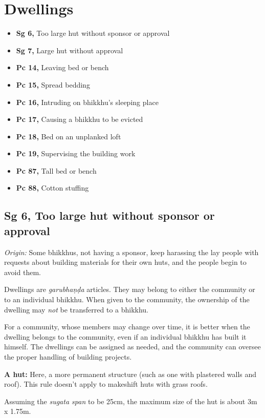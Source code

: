\chapter{Dwellings}

\begin{itemize}
\tightlist
\item
  \textbf{Sg 6,} Too large hut without sponsor or approval
\item
  \textbf{Sg 7,} Large hut without approval
\item
  \textbf{Pc 14,} Leaving bed or bench
\item
  \textbf{Pc 15,} Spread bedding
\item
  \textbf{Pc 16,} Intruding on bhikkhu's sleeping place
\item
  \textbf{Pc 17,} Causing a bhikkhu to be evicted
\item
  \textbf{Pc 18,} Bed on an unplanked loft
\item
  \textbf{Pc 19,} Supervising the building work
\item
  \textbf{Pc 87,} Tall bed or bench
\item
  \textbf{Pc 88,} Cotton stuffing
\end{itemize}

\section{Sg 6, Too large hut without sponsor or approval}

\emph{Origin:} Some bhikkhus, not having a sponsor, keep harassing the
lay people with requests about building materials for their own huts,
and the people begin to avoid them.

Dwellings are \emph{garubhaṇḍa} articles. They may belong to either the
community or to an individual bhikkhu. When given to the community, the
ownership of the dwelling may \emph{not} be transferred to a bhikkhu.

For a community, whose members may change over time, it is better when
the dwelling belongs to the community, even if an individual bhikkhu has
built it himself. The dwellings can be assigned as needed, and the
community can oversee the proper handling of building projects.

\textbf{A hut:} Here, a more permanent structure (such as one with
plastered walls and roof). This rule doesn't apply to makeshift huts
with grass roofs.

Assuming the \emph{sugata span} to be 25cm, the maximum size of the hut
is about 3m x 1.75m.


